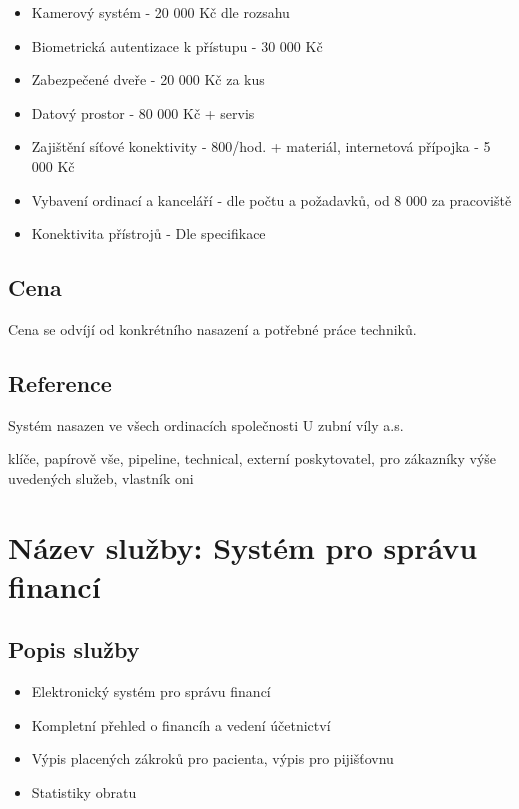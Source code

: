 \documentclass[12pt, a4paper, titlepage]{article}
\begin{document}
	\begin{itemize}
		\item Kamerový systém - 20 000 Kč dle rozsahu
		\item Biometrická autentizace k přístupu - 30 000 Kč
		\item Zabezpečené dveře - 20 000 Kč za kus
		\item Datový prostor - 80 000 Kč + servis
		\item Zajištění síťové konektivity - 800/hod. + materiál, internetová přípojka - 5 000 Kč
		\item Vybavení ordinací a kanceláří - dle počtu a požadavků, od 8 000 za pracoviště
		\item Konektivita přístrojů - Dle specifikace
	\end{itemize}

	\subsection*{Cena}
	Cena se odvíjí od konkrétního nasazení a potřebné práce techniků.

	\subsection*{Reference}
	Systém nasazen ve všech ordinacích společnosti U zubní víly a.s.


	klíče, papírově vše, pipeline, technical, externí poskytovatel, pro zákazníky výše uvedených služeb,
	vlastník oni

	\newpage

	\noindent\makebox[\linewidth]{\rule{16cm}{0.4pt}}

	\section*{Název služby: Systém pro správu financí}

	\subsection*{Popis služby}
	\begin{itemize}
		\item Elektronický systém pro správu financí
		\item Kompletní přehled o financíh a vedení účetnictví
		\item Výpis placených zákroků pro pacienta, výpis pro pijišťovnu
		\item Statistiky obratu
	\end{itemize}
\end{document}
